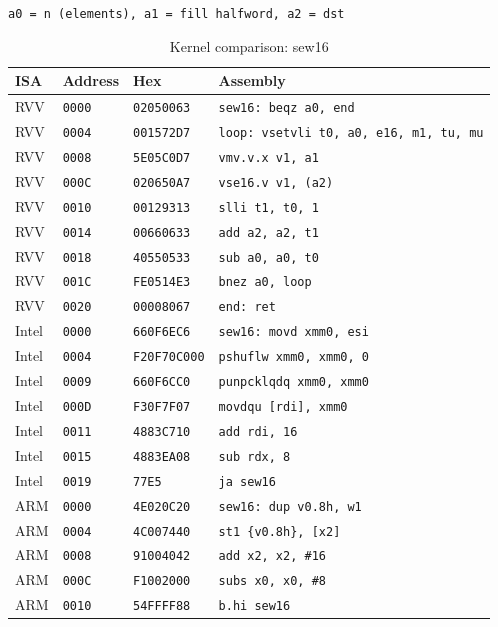 \begin{table}[htbp]
\centering
\caption{Kernel comparison: sew16}
\begingroup
\scriptsize
\setlength{\tabcolsep}{4pt}
\noindent \texttt{a0 = n (elements), a1 = fill halfword, a2 = dst}\par
\vspace{0.6ex}
\begin{tabular}{@{}l|l|l|p{7.2cm}@{}}
\toprule
ISA & Address & Hex & Assembly \\
\midrule
RVV & \texttt{0000} & \texttt{02050063} & \texttt{sew16: beqz a0, end} \\
RVV & \texttt{0004} & \texttt{001572D7} & \texttt{loop: vsetvli t0, a0, e16, m1, tu, mu} \\
RVV & \texttt{0008} & \texttt{5E05C0D7} & \texttt{vmv.v.x v1, a1} \\
RVV & \texttt{000C} & \texttt{020650A7} & \texttt{vse16.v v1, (a2)} \\
RVV & \texttt{0010} & \texttt{00129313} & \texttt{slli t1, t0, 1} \\
RVV & \texttt{0014} & \texttt{00660633} & \texttt{add a2, a2, t1} \\
RVV & \texttt{0018} & \texttt{40550533} & \texttt{sub a0, a0, t0} \\
RVV & \texttt{001C} & \texttt{FE0514E3} & \texttt{bnez a0, loop} \\
RVV & \texttt{0020} & \texttt{00008067} & \texttt{end: ret} \\
\midrule
Intel & \texttt{0000} & \texttt{660F6EC6} & \texttt{sew16: movd xmm0, esi} \\
Intel & \texttt{0004} & \texttt{F20F70C000} & \texttt{pshuflw xmm0, xmm0, 0} \\
Intel & \texttt{0009} & \texttt{660F6CC0} & \texttt{punpcklqdq xmm0, xmm0} \\
Intel & \texttt{000D} & \texttt{F30F7F07} & \texttt{movdqu [rdi], xmm0} \\
Intel & \texttt{0011} & \texttt{4883C710} & \texttt{add rdi, 16} \\
Intel & \texttt{0015} & \texttt{4883EA08} & \texttt{sub rdx, 8} \\
Intel & \texttt{0019} & \texttt{77E5} & \texttt{ja sew16} \\
\midrule
ARM & \texttt{0000} & \texttt{4E020C20} & \texttt{sew16: dup v0.8h, w1} \\
ARM & \texttt{0004} & \texttt{4C007440} & \texttt{st1 \{v0.8h\}, [x2]} \\
ARM & \texttt{0008} & \texttt{91004042} & \texttt{add x2, x2, \#16} \\
ARM & \texttt{000C} & \texttt{F1002000} & \texttt{subs x0, x0, \#8} \\
ARM & \texttt{0010} & \texttt{54FFFF88} & \texttt{b.hi sew16} \\
\bottomrule
\end{tabular}
\endgroup
\end{table}
\noindent{}\par
